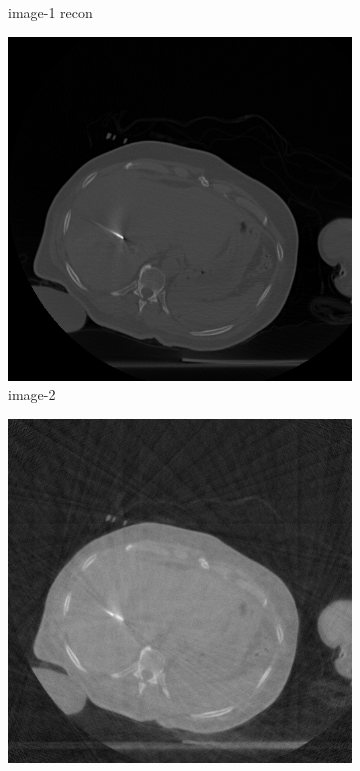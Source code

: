 \documentclass[journal]{IEEEtran}
\begin{document}
\begin{figure}[!h]
\begin{subfigure}[b]{0.24\linewidth}
\captionsetup{labelformat=empty}       
 \caption{image-1 recon}
    \end{subfigure}
 \begin{subfigure}[b]{0.24\linewidth}
        \includegraphics[width=\textwidth]{../images/tmh/RFA2/template2.png}
\captionsetup{labelformat=empty}       
 \caption{image-2}
    \end{subfigure}
       \begin{subfigure}[b]{0.24\linewidth}
        \includegraphics[width=\textwidth]{../images/tmh/RFA2/new_protocol/result_image_2.png}

\end{subfigure}
\end{figure}
\end{document}

